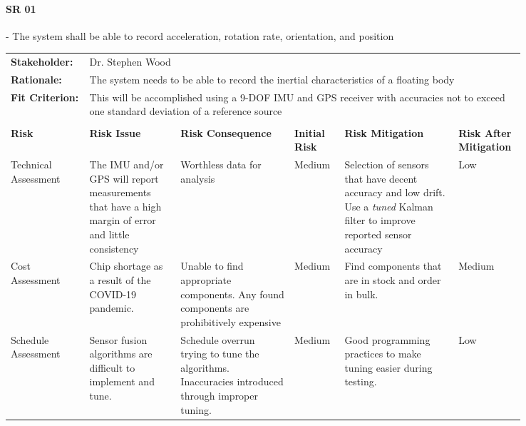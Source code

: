 \begin{landscape}
\paragraph*{SR 01} - The system shall be able to record acceleration, rotation rate, orientation, and position

{\fontsize{8pt}{8pt}\selectfont
\begin{longtable}{| p{0.12\linewidth} | p{0.16\linewidth} |  p{0.20\linewidth} | p{0.08\linewidth} | p{0.20\linewidth} | p{0.08\linewidth} |}
	\hline \endlastfoot
	
	\hline
	\rowcolor[gray]{0.8}
	\multicolumn{6}{|c|}{ } \\
	\hline
	\textbf{Stakeholder:} & \multicolumn{5}{|l|}{Dr. Stephen Wood} \\
	\hline
	\textbf{Rationale:} & \multicolumn{5}{|p{0.8\linewidth}|}{The system needs to be able to record the inertial characteristics of a floating body} \\
	\hline
	\textbf{Fit Criterion:} & \multicolumn{5}{|p{0.8\linewidth}|}{This will be accomplished using a 9-DOF IMU and GPS receiver with accuracies not to exceed one standard deviation of a reference source} \\
	\hline
	\rowcolor[gray]{0.8}
	\multicolumn{6}{|c|}{ } \\
	\hline
	\textbf{Risk} & \textbf{Risk Issue} & \textbf{Risk Consequence} & \textbf{Initial Risk} & \textbf{Risk Mitigation} & \textbf{Risk \newline After \newline Mitigation} \\
	\hline
	Technical \newline Assessment & The IMU and/or GPS will report measurements that have a high margin of error and little consistency & Worthless data for analysis & \cellcolor{yellow} Medium & Selection of sensors that have decent accuracy and low drift. \newline Use a \emph{tuned} Kalman filter to improve reported sensor accuracy & \cellcolor{green} Low \\
	\hline
	Cost \newline Assessment & Chip shortage as a result of the COVID-19 pandemic. & Unable to find appropriate components. \newline Any found components are prohibitively expensive & \cellcolor{yellow} Medium & Find components that are in stock and order in bulk. & \cellcolor{yellow} Medium \\
	\hline
	Schedule \newline Assessment & Sensor fusion algorithms are difficult to implement and tune. & Schedule overrun trying to tune the algorithms. \newline Inaccuracies introduced through improper tuning. & \cellcolor{yellow} Medium & Good programming practices to make tuning easier during testing. & \cellcolor{green} Low \\

\end{longtable}}
\end{landscape}
